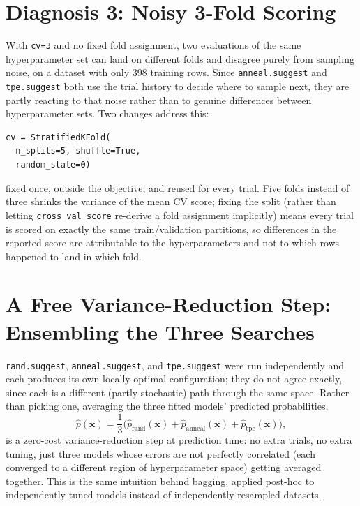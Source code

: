 \documentclass[conference]{IEEEtran}
\begin{document}
\section*{Diagnosis 3: Noisy 3-Fold Scoring}
With \texttt{cv=3} and no fixed fold assignment, two evaluations of the same hyperparameter set can land on different folds and disagree purely from sampling noise, on a dataset with only 398 training rows. Since \texttt{anneal.suggest} and \texttt{tpe.suggest} both use the trial history to decide where to sample next, they are partly reacting to that noise rather than to genuine differences between hyperparameter sets. Two changes address this:
\begin{verbatim}
cv = StratifiedKFold(
  n_splits=5, shuffle=True,
  random_state=0)
\end{verbatim}
fixed once, outside the objective, and reused for every trial. Five folds instead of three shrinks the variance of the mean CV score; fixing the split (rather than letting \texttt{cross\_val\_score} re-derive a fold assignment implicitly) means every trial is scored on exactly the same train/validation partitions, so differences in the reported score are attributable to the hyperparameters and not to which rows happened to land in which fold.

\section*{A Free Variance-Reduction Step: Ensembling the Three Searches}
\texttt{rand.suggest}, \texttt{anneal.suggest}, and \texttt{tpe.suggest} were run independently and each produces its own locally-optimal configuration; they do not agree exactly, since each is a different (partly stochastic) path through the same space. Rather than picking one, averaging the three fitted models' predicted probabilities,
\begin{equation}
    \hat{p}(\mathbf{x}) = \frac{1}{3}\Big(\hat{p}_{\text{rand}}(\mathbf{x}) + \hat{p}_{\text{anneal}}(\mathbf{x}) + \hat{p}_{\text{tpe}}(\mathbf{x})\Big),
\end{equation}
is a zero-cost variance-reduction step at prediction time: no extra trials, no extra tuning, just three models whose errors are not perfectly correlated (each converged to a different region of hyperparameter space) getting averaged together. This is the same intuition behind bagging, applied post-hoc to independently-tuned models instead of independently-resampled datasets.
\end{document}
